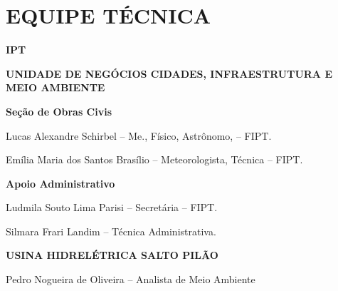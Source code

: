 \section{EQUIPE TÉCNICA}
\label{section:equip_tec}

\par{\textbf{IPT}}
\par{\textbf{UNIDADE DE NEGÓCIOS CIDADES, INFRAESTRUTURA E MEIO AMBIENTE}}
\par{\textbf{Seção de Obras Civis}}
\par{Lucas Alexandre Schirbel – Me., Físico, Astrônomo, – FIPT.}
\par{Emília Maria dos Santos Brasílio – Meteorologista, Técnica – FIPT.}
\par{\textbf{Apoio Administrativo}}
\par{Ludmila Souto Lima Parisi – Secretária – FIPT.}
\par{Silmara Frari Landim – Técnica Administrativa.}
\par{\textbf{USINA HIDRELÉTRICA SALTO PILÃO}}
\par{Pedro Nogueira de Oliveira – Analista de Meio Ambiente}
